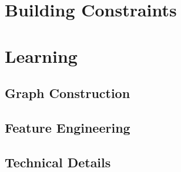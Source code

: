 \section{Building  Constraints}\label{sec:i-training-crfs}

\section{Learning }\label{sec:i-learning-crfs}

\subsection{Graph Construction}\label{subsec:i-graph-construction}

\subsection{Feature Engineering}\label{subsec:i-feature-engineering}

\subsection{Technical Details}\label{subsec:i-technical-details}
